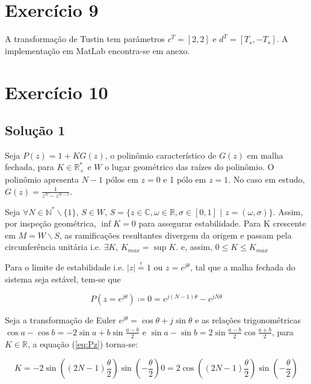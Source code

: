 \documentclass[twoside, fleqn]{article}
\begin{document}
\section*{Exercício 9}
\label{ex:ex9}

    A transformação de Tustin tem parâmetros $c^T = [2, 2]$ e $d^T = [T_s, -T_s]$. A implementação em MatLab encontra-se em anexo.

\section*{Exercício 10}

\subsection*{Solução 1}

    Seja $P(z) = 1 + K G(z)$, o polinômio característico de $G(z)$ em malha fechada, para $K \in \mathbb{R}^*_{+}$ e $W$ o lugar geométrico das raízes do polinômio. O polinômio apresenta $N-1$ pólos em $z = 0$ e 1 pólo em $z = 1$. No caso em estudo, $G(z) = \frac{1}{z^{N} - z^{N-1}}$.
    
    Seja $\forall N \in \mathbb{N}^*\backslash{\{1\}}$, $S \in W$, $S = \{z \in \mathbb{C}, \omega \in \mathbb{R}, \sigma \in [0, 1] \,\, | \,\, z = (\omega, \sigma)\}$. Assim, por inspeção geométrica, $\inf K = 0$ para assegurar estabilidade. Para K crescente em $M = W \backslash {S}$, as ramificações resultantes divergem da origem e passam pela circunferência unitária i.e. $\exists K$, $K_{max} = \sup K$. e, assim, $0 \leq K \leq K_{max}$
    
    Para o limite de estabilidade i.e. $|z| \stackrel{!}{=} 1$ ou $z = e^{j \theta}$, tal que a malha fechada do sistema seja estável, tem-se que
    
        \begin{equation}
            P(z = e^{j \theta}) \coloneqq 0 = e^{j (N-1) \theta} - e^{j N \theta}
            \label{eq:Pz}
        \end{equation}
    
    Seja a transformação de Euler $e^{j \theta} = \cos{\theta} + j \sin{\theta}$ e as relações trigonométricas $\cos{a} - \cos{b} = -2 \sin{a+b} \sin{\frac{a-b}{2}}$ e $\sin{a} - \sin{b} = 2 \sin{\frac{a-b}{2}} \cos{\frac{a+b}{2}}$, para $K \in \mathbb{R}$, a equação (\ref{eq:Pz}) torna-se:
    
        \begin{subequations}
            \begin{equation}
                K = -2 \sin\left((2N - 1) \frac{\theta}{2}\right) \sin\left(- \frac{\theta}{2}\right)
            \end{equation}
            \begin{equation}
                0 =  2 \cos\left((2N - 1) \frac{\theta}{2}\right) \sin\left(-\frac{\theta}{2}\right)
            \label{eq:imagP}
            \end{equation}
        \end{subequations}
    
\end{document}
